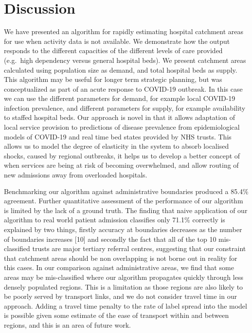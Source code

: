 \documentclass[
]{article}
\begin{document}
\hypertarget{discussion}{%
\section{Discussion}\label{discussion}}

We have presented an algorithm for rapidly estimating hospital catchment
areas for use when activity data is not available. We demonstrate how
the output responds to the different capacities of the different levels
of care provided (e.g.~high dependency versus general hospital beds). We
present catchment areas calculated using population size as demand, and
total hospital beds as supply. This algorithm may be useful for longer
term strategic planning, but was conceptualized as part of an acute
response to COVID-19 outbreak. In this case we can use the different
parameters for demand, for example local COVID-19 infection prevalence,
and different parameters for supply, for example availability to staffed
hospital beds. Our approach is novel in that it allows adaptation of
local service provision to predictions of disease prevalence from
epidemiological models of COVID-19 and real time bed states provided by
NHS trusts. This allows us to model the degree of elasticity in the
system to absorb localised shocks, caused by regional outbreaks, it
helps us to develop a better concept of when services are being at risk
of becoming overwhelmed, and allow routing of new admissions away from
overloaded hospitals.

Benchmarking our algorithm against administrative boundaries produced a
85.4\% agreement. Further quantitative assessment of the performance of
our algorithm is limited by the lack of a ground truth. The finding that
naive application of our algorithm to real world patient admission
classifies only 71.1\% correctly is explained by two things, firstly
accuracy at boundaries decreases as the number of boundaries increases
{[}10{]} and secondly the fact that all of the top 10 mis-classified
trusts are major tertiary referral centres, suggesting that our
constraint that catchment areas should be non overlapping is not borne
out in reality for this cases. In our comparison against administrative
areas, we find that some areas may be mis-classified where our algorithm
propagates quickly through less densely populated regions. This is a
limitation as those regions are also likely to be poorly served by
transport links, and we do not consider travel time in our approach.
Adding a travel time penalty to the rate of label spread into the model
is possible given some estimate of the ease of transport within and
between regions, and this is an area of future work.
\end{document}
